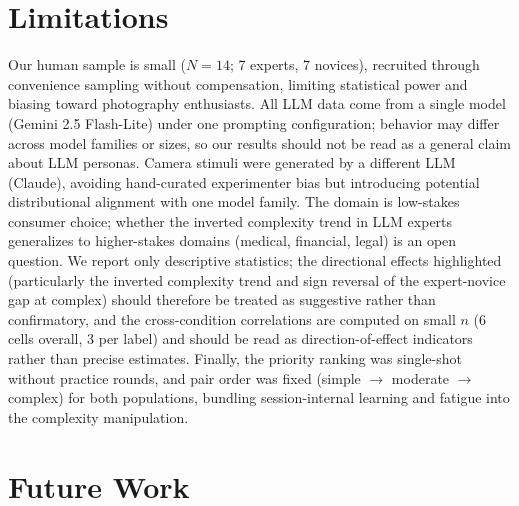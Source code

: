 \documentclass[manuscript,review]{acmart}
\begin{document}
\section{Limitations}\label{app:limitations}

Our human sample is small ($N = 14$; 7 experts, 7 novices), recruited through convenience sampling without compensation, limiting statistical power and biasing toward photography enthusiasts. All LLM data come from a single model (Gemini 2.5 Flash-Lite) under one prompting configuration; behavior may differ across model families or sizes, so our results should not be read as a general claim about LLM personas. Camera stimuli were generated by a different LLM (Claude), avoiding hand-curated experimenter bias but introducing potential distributional alignment with one model family. The domain is low-stakes consumer choice; whether the inverted complexity trend in LLM experts generalizes to higher-stakes domains (medical, financial, legal) is an open question. We report only descriptive statistics; the directional effects highlighted (particularly the inverted complexity trend and sign reversal of the expert-novice gap at complex) should therefore be treated as suggestive rather than confirmatory, and the cross-condition correlations are computed on small $n$ (6 cells overall, 3 per label) and should be read as direction-of-effect indicators rather than precise estimates. Finally, the priority ranking was single-shot without practice rounds, and pair order was fixed (simple $\rightarrow$ moderate $\rightarrow$ complex) for both populations, bundling session-internal learning and fatigue into the complexity manipulation.

\section{Future Work}\label{app:future}
\end{document}

